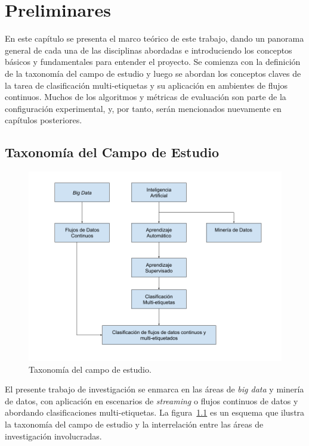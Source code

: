 \chapter{Preliminares}
\label{chapter:preliminares}

En este capítulo se presenta el marco teórico de este trabajo, dando un panorama
general de cada una de las disciplinas abordadas e introduciendo los conceptos
básicos y fundamentales para entender el proyecto. Se comienza con la definición
de la taxonomía del campo de estudio y luego se abordan los conceptos claves de
la tarea de clasificación multi-etiquetas y su aplicación en ambientes de flujos
continuos. Muchos de los algoritmos y métricas de evaluación son parte de la
configuración experimental, y, por tanto, serán mencionados nuevamente en
capítulos posteriores.

\section{Taxonomía del Campo de Estudio}

\begin{figure}[htbp]
	\includegraphics[width=.9\linewidth]{figures/study_field_taxonomy_v2.png}
	\centering
	\caption{Taxonomía del campo de estudio.}
	\label{fig:campo_estudio}
\end{figure}

El presente trabajo de investigación se enmarca en las áreas de \textit{big
	data} y minería de datos, con aplicación en escenarios de \textit{streaming} o
flujos continuos de datos y abordando clasificaciones multi-etiquetas. La
figura~\ref{fig:campo_estudio} es un esquema que ilustra la taxonomía del campo
de estudio y la interrelación entre las áreas de investigación involucradas.


